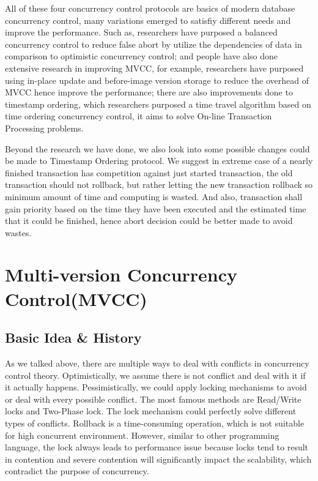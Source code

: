 All of these four concurrency control protocols are basics of modern database concurrency control, many variations emerged to satisfiy different needs and improve the performance. Such as, researchers have purposed a balanced concurrency control to reduce false abort by utilize the dependencies of data in comparison to optimistic concurrency control\cite{yuan2016bcc}; and people have also done extensive research in improving MVCC, for example, researchers have purposed using in-place update and before-image version storage to reduce the overhead of MVCC hence improve the performance\cite{neumann2015fast}; there are also improvements done to timestamp ordering, which researchers purposed a time travel algorithm based on time ordering concurrency control, it aims to solve On-line Transaction Processing problems\cite{yu2016tictoc}.

Beyond the research we have done, we also look into some possible changes could be made to Timestamp Ordering protocol. We suggest in extreme case of a nearly finished transaction has competition against just started transaction, the old transaction should not rollback, but rather letting the new transaction rollback so minimum amount of time and computing is wasted. And also, transaction shall gain priority based on the time they have been executed and the estimated time that it could be finished, hence abort decision could be better made to avoid wastes.

\section{Multi-version Concurrency Control(MVCC)}
\subsection{Basic Idea \& History}
As we talked above, there are multiple ways to deal with conflicts in concurrency control theory. Optimistically, we assume there is not conflict and deal with it if it actually happens. Pessimistically, we could apply locking mechanisms to avoid or deal with every possible conflict. The most famous methods are Read/Write locks and Two-Phase lock. The lock mechanism could perfectly solve different types of conflicts. Rollback is a time-consuming operation, which is not suitable for high concurrent environment. However, similar to other programming language, the lock always leads to performance issue because locks tend to result in contention and severe contention will significantly impact the scalability, which contradict the purpose of concurrency.\\

